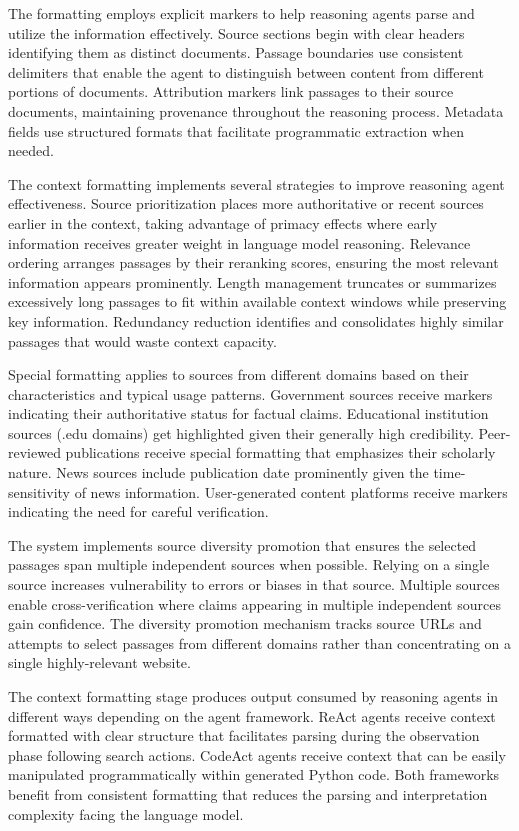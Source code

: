 The formatting employs explicit markers to help reasoning agents parse and utilize the information effectively. Source sections begin with clear headers identifying them as distinct documents. Passage boundaries use consistent delimiters that enable the agent to distinguish between content from different portions of documents. Attribution markers link passages to their source documents, maintaining provenance throughout the reasoning process. Metadata fields use structured formats that facilitate programmatic extraction when needed.

The context formatting implements several strategies to improve reasoning agent effectiveness. Source prioritization places more authoritative or recent sources earlier in the context, taking advantage of primacy effects where early information receives greater weight in language model reasoning. Relevance ordering arranges passages by their reranking scores, ensuring the most relevant information appears prominently. Length management truncates or summarizes excessively long passages to fit within available context windows while preserving key information. Redundancy reduction identifies and consolidates highly similar passages that would waste context capacity.

Special formatting applies to sources from different domains based on their characteristics and typical usage patterns. Government sources receive markers indicating their authoritative status for factual claims. Educational institution sources (.edu domains) get highlighted given their generally high credibility. Peer-reviewed publications receive special formatting that emphasizes their scholarly nature. News sources include publication date prominently given the time-sensitivity of news information. User-generated content platforms receive markers indicating the need for careful verification.

The system implements source diversity promotion that ensures the selected passages span multiple independent sources when possible. Relying on a single source increases vulnerability to errors or biases in that source. Multiple sources enable cross-verification where claims appearing in multiple independent sources gain confidence. The diversity promotion mechanism tracks source URLs and attempts to select passages from different domains rather than concentrating on a single highly-relevant website.

The context formatting stage produces output consumed by reasoning agents in different ways depending on the agent framework. ReAct agents receive context formatted with clear structure that facilitates parsing during the observation phase following search actions. CodeAct agents receive context that can be easily manipulated programmatically within generated Python code. Both frameworks benefit from consistent formatting that reduces the parsing and interpretation complexity facing the language model.

